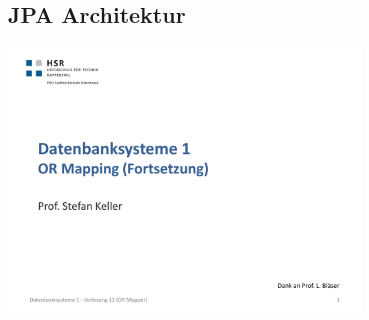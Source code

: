     \subsection{JPA Architektur}
        \includegraphics[page=7,trim=50 40 0 90,clip=true,width=0.7\textwidth]{images/or-mapping_fortsetzung.pdf}                